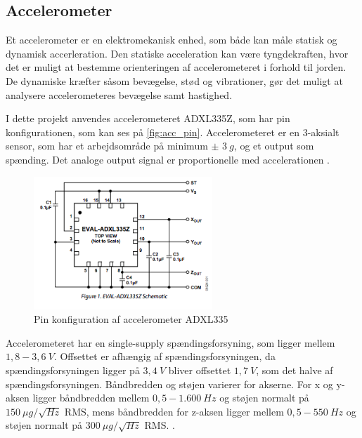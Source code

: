 \subsection{Accelerometer} \label{sec:acc}
Et accelerometer er en elektromekanisk enhed, som både kan måle statisk og dynamisk accerleration. Den statiske acceleration kan være tyngdekraften, hvor det er muligt at bestemme orienteringen af accelerometeret i forhold til jorden. De dynamiske kræfter såsom bevægelse, stød og vibrationer, gør det muligt at analysere accelerometeres bevægelse samt hastighed. 

I dette projekt anvendes accelerometeret ADXL335Z, som har pin konfigurationen, som kan ses på \autoref{fig:acc_pin}. Accelerometeret er en 3-aksialt sensor, som har et arbejdsområde på minimum $\pm$ $3~g$, og et output som spænding. Det analoge output signal er proportionelle med accelerationen \citep{analogdevices2009}. 


\begin{figure}[H]
\centering
\includegraphics[width=0.6\textwidth]{figures/acc_pin.png}
\caption{Pin konfiguration af accelerometer ADXL335 \citep{analogdevices2009}}
\label{fig:acc_pin}
\end{figure}

\noindent
Accelerometeret har en single-supply spændingsforsyning, som ligger mellem $1,8 - 3,6~V$.  Offsettet er afhængig af spændingsforsyningen, da spændingsforsyningen ligger på $3,4~V$ bliver offsettet $1,7~V$, som det halve af spændingsforsyningen. Båndbredden og støjen varierer for akserne. For x og y-aksen ligger båndbredden mellem $0,5 - 1.600~Hz$ og støjen normalt på $150~\mu g/\sqrt{Hz}$ RMS, mens båndbredden for z-aksen ligger mellem $0,5 - 550~Hz$ og støjen normalt på $300~\mu g/\sqrt{Hz}$ RMS.  \citep{analogdevices2010}. 

